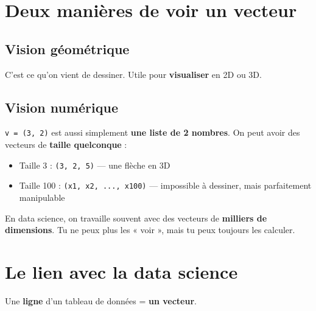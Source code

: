 \documentclass[
  french,
  11pt,
  a4paper,
]{scrbook}
\providecommand{\tightlist}{%
  \setlength{\itemsep}{0pt}\setlength{\parskip}{0pt}}
\begin{document}
\section{Deux manières de voir un
vecteur}\label{deux-maniuxe8res-de-voir-un-vecteur}

\subsection{Vision géométrique}

C'est ce qu'on vient de dessiner. Utile pour \textbf{visualiser} en 2D
ou 3D.

\subsection{Vision numérique}

\texttt{v\ =\ (3,\ 2)} est aussi simplement \textbf{une liste de 2
nombres}. On peut avoir des vecteurs de \textbf{taille quelconque} :

\begin{itemize}
\tightlist
\item
  Taille 3 : \texttt{(3,\ 2,\ 5)} --- une flèche en 3D
\item
  Taille 100 : \texttt{(x1,\ x2,\ ...,\ x100)} --- impossible à
  dessiner, mais parfaitement manipulable
\end{itemize}

\begin{tcolorbox}[enhanced jigsaw, arc=.35mm, bottomrule=.15mm, bottomtitle=1mm, breakable, colback=white, colbacktitle=quarto-callout-tip-color!10!white, colframe=quarto-callout-tip-color-frame, coltitle=black, left=2mm, leftrule=.75mm, opacityback=0, opacitybacktitle=0.6, rightrule=.15mm, title=\textcolor{quarto-callout-tip-color}{\faLightbulb}\hspace{0.5em}{🧠 À retenir}, titlerule=0mm, toprule=.15mm, toptitle=1mm]

En data science, on travaille souvent avec des vecteurs de
\textbf{milliers de dimensions}. Tu ne peux plus les « voir », mais tu
peux toujours les calculer.

\end{tcolorbox}

\section{Le lien avec la data
science}\label{le-lien-avec-la-data-science}

Une \textbf{ligne} d'un tableau de données = \textbf{un vecteur}.
\end{document}

